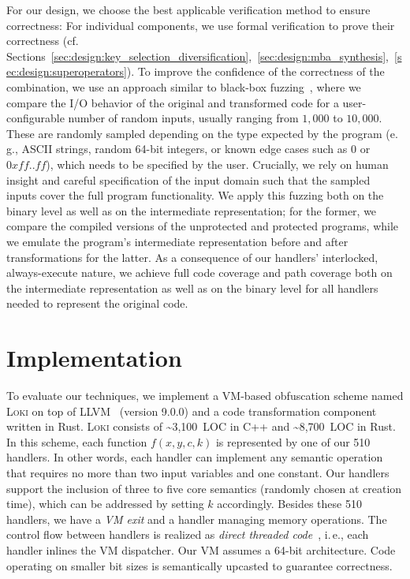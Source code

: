 \documentclass[letterpaper,twocolumn,10pt]{article}
\newcommand{\eg}{e.\,g.,\xspace}
\newcommand{\ie}{i.\,e.,\xspace}
\newcommand{\cf}{cf.\xspace}
\theoremstyle{customexample}
\theoremstyle{customexperiment}
\newcommand{\loki}{\textsc{Loki}\xspace}
\newcommand{\llvm}{{\textsc{LLVM}}\xspace}
\begin{document}
For our design, we choose the best applicable verification method to ensure correctness: For individual components, we use formal verification to prove their correctness (\cf Sections~\ref{sec:design:key_selection_diversification},~\ref{sec:design:mba_synthesis},~\ref{sec:design:superoperators}).
To improve the confidence of the correctness of the combination, we use an approach similar to black-box fuzzing~\cite{radamsa,peach}, where we compare the I/O behavior of the original and transformed code for a user-configurable number of random inputs, usually ranging from $1,000$ to $10,000$. These are randomly sampled depending on the type expected by the program (\eg ASCII strings, random 64-bit integers, or known edge cases such as $0$ or $0xff..ff$), which needs to be specified by the user. Crucially, we rely on human insight and careful specification of the input domain such that the sampled inputs cover the full program functionality. We apply this fuzzing both on the binary level as well as on the intermediate representation; for the former, we compare the compiled versions of the unprotected and protected programs, while we emulate the program's intermediate representation before and after transformations for the latter. 
As a consequence of our handlers' interlocked, always-execute nature, we achieve full code coverage and path coverage both on the intermediate representation as well as on the binary level for all handlers needed to represent the original code.
 \section{Implementation}\label{sec:implementation}

To evaluate our techniques, we implement a VM-based obfuscation scheme named \loki on top of \llvm~\cite{llvm_homepage} (version 9.0.0) and a code transformation component written in Rust. \loki consists of \textasciitilde3,100~LOC in C++ and \textasciitilde8,700~LOC in Rust. In this scheme, each function $f(x, y, c, k)$ is represented by one of our 510 handlers. In other words, each handler can implement any semantic operation that requires no more than two input variables and one constant. Our handlers support the inclusion of three to five core semantics (randomly chosen at creation time), which can be addressed by setting $k$ accordingly. Besides these 510 handlers, we have a \emph{VM exit} and a handler managing memory operations. The control flow between handlers is realized as \emph{direct threaded code}~\cite{klint1981interpretation}, \ie each handler inlines the VM dispatcher. Our VM assumes a 64-bit architecture. Code operating on smaller bit sizes is semantically upcasted to guarantee correctness.
\end{document}
